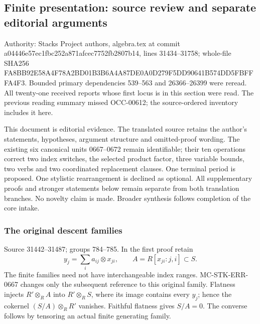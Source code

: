 \subsection{Finite presentation: source review and separate editorial arguments}\label{algebra-proof-035-finite-presentation-source-review-and-separate-editorial-arguments}

Authority: Stacks Project authors, algebra.tex at commit a044\allowbreak{}46e5\allowbreak{}7ec1\allowbreak{}fbc2\allowbreak{}52a8\allowbreak{}71af\allowbreak{}cec7\allowbreak{}752f\allowbreak{}b280\allowbreak{}7b14, lines 31434--31758; whole-file SHA256 FA8B\allowbreak{}B92E\allowbreak{}58A4\allowbreak{}F78A\allowbreak{}2BD0\allowbreak{}1B3B\allowbreak{}6A4A\allowbreak{}87DE\allowbreak{}0A0D\allowbreak{}279F\allowbreak{}5DD9\allowbreak{}0641\allowbreak{}B574\allowbreak{}DD5F\allowbreak{}BFFF\allowbreak{}A4F3. Bounded primary dependencies 539--563 and 26366--26399 were reread. All twenty-one received reports whose first locus is in this section were read. The previous reading summary missed OCC-00612; the source-ordered inventory includes it here.

This document is editorial evidence. The translated source retains the author's statements, hypotheses, argument structure and omitted-proof wording. The existing six canonical units 0667--0672 remain identifiable; their ten operations correct two index switches, the selected product factor, three variable bounds, two verbs and two coordinated replacement clauses. One terminal period is proposed. One stylistic rearrangement is declined as optional. All supplementary proofs and stronger statements below remain separate from both translation branches. No novelty claim is made. Broader synthesis follows completion of the core intake.

\subsubsection{The original descent families}\label{algebra-proof-035-the-original-descent-families}

Source 31442--31487; groups 784--785. In the first proof retain \[
y_j=\sum_i a_{ij}\otimes x_{ji},\qquad
A=R[x_{ji}:j,i]\subset S.
\] The finite families need not have interchangeable index ranges. MC-\AlgebraIdentifierBreak{}STK-\AlgebraIdentifierBreak{}ERR-\AlgebraIdentifierBreak{}0667 changes only the subsequent reference to this original family. Flatness injects \(R'\otimes_R A\) into \(R'\otimes_R S\), where its image contains every \(y_j\); hence the cokernel \((S/A)\otimes_R R'\) vanishes. Faithful flatness gives \(S/A=0\). The converse follows by tensoring an actual finite generating family.

